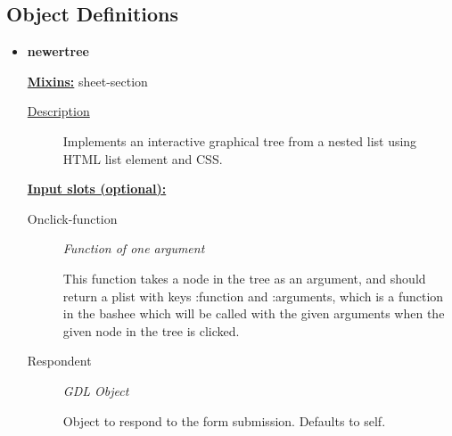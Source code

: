 \documentclass [11pt]{book}
\begin{document}
\label{sec:tree(treecomponentusedbytastyandpotentiallyasauicomponentonitsown)}





\subsection{Object Definitions}

\label{subsec:objectdefinitions}



\begin{itemize}

\item {}
\label{prim:newertree}
\textbf{newertree}


\textbf{
\underline{Mixins:}} sheet-section





\begin{description}

\item [
\underline{Description}]


Implements an interactive graphical tree from a nested list using HTML list element and CSS.



\end{description}








\textbf{
\underline{Input slots (optional):}}

\begin{description}

\item [Onclick-function]
\emph{Function of one argument}

 This function takes a node in the tree as an argument, and should return
a plist with keys :function and :arguments, which is a function in the bashee which will be called
with the given arguments when the given node in the tree is clicked.




\item [Respondent]
\emph{GDL Object}

 Object to respond to the form submission. Defaults to self.




\end{description}







\end{itemize}
\end{document}

